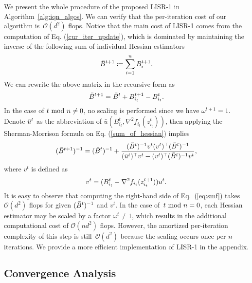 \documentclass[letterpaper]{article} %
\theoremstyle{plain}
\theoremstyle{definition}
\theoremstyle{remark}
\def\fO{{\mathcal{O}}}
\begin{document}
We present the whole procedure of the proposed LISR-1 in Algorithm~\ref{alg:iqn_algos}.
We can verify that the per-iteration cost of our algorithm is~$\fO(d^2)$ flops.
Notice that the main cost of LISR-1 comes from the computation of Eq. (\ref{cur_iter_update}), which is dominated by maintaining the inverse of the following sum of individual Hessian estimators
\begin{equation*}
    \Bar{B}^{t+1} \coloneqq \sum_{i=1}^n B_i^{t+1}.
\end{equation*}
We can rewrite the above matrix in the recursive form as
\begin{equation}\label{sum_of_hessian}
\Bar{B}^{t+1} = \Bar{B}^{t} + B_{i_t}^{t+1} - B_{i_t}^{t}.
\end{equation}
In the case of $t~{\rm mod}~n \neq 0$, no scaling is performed since we have $\omega^{t+1}=1$. Denote $\Bar{u}^t$ as the abbreviation of $\bar{u}(B_{i_t}^t, \nabla^2 f_{i_t}(z_{i_t}^t))$, then applying the Sherman-Morrison formula on Eq. (\ref{sum_of_hessian}) implies
\begin{equation}\label{eq:smf}
    (\Bar{B}^{t+1})^{-1} = (\Bar{B}^{t})^{-1} + \frac{(\Bar{B}^{t})^{-1}v^{t}(v^{t})^{\top}(\Bar{B}^{t})^{-1}}{(\bar{u}^t)^{\top} v^{t} - (v^{t})^{\top} (\Bar{B}^{t})^{-1} v^{t}},
\end{equation}
where $v^{t}$ is defined as
\begin{equation*}
    v^{t} = (B_{i_{t}}^{t} - \nabla^2 f_{i_{t}} (z_{i_{t}}^{t+1})) \Bar{u}^t.
\end{equation*}
It is easy to observe that computing the right-hand side of Eq.~(\ref{eq:smf}) takes $\fO(d^2)$ flops for given $(\Bar B^t)^{-1}$ and $v^t$.
In the case of~$t~{\rm mod}~n = 0$, each Hessian estimator may be scaled by a factor $\omega^t\neq 1$, which results in the additional computational cost of $\fO(n d^2)$ flops. However, the amortized per-iteration complexity of this step is still~$\fO(d^2)$ because the scaling occurs once per $n$ iterations.
We provide a more efficient implementation of LISR-1 in the appendix.

\subsection{Convergence Analysis} 
\end{document}
